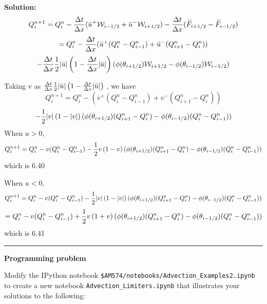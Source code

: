 \documentclass[11pt]{article}
\begin{document}
\vskip 1cm
{\bf Solution:}
\[
Q_i^{n+1} = Q_i^n - \frac{\Delta t}{\Delta x} (\bar u^+ {\cal W}_{i-1/2}  + \bar u^- {\cal W}_{i+1/2})
-\frac{\Delta t}{\Delta x} (\widetilde F_{i+1/2} - \widetilde F_{i-1/2})
\]
\[= Q_i^n - \frac{\Delta t}{\Delta x} (\bar u^+ (Q_i^n - Q_{i-1}^n)  + \bar u^-(Q_{i+1}^n - Q_{i}^n))
\]
\[-\frac{\Delta t}{\Delta x}{\frac{1}{2}} |\bar u| 
\left(1 - \frac{\Delta t}{\Delta x} |\bar u|\right) ( \phi(\theta_{i+1/2}) {\cal W}_{i+1/2} - \phi(\theta_{i-1/2}) {\cal W}_{i-1/2})
\]
 
Taking v as $\frac{\Delta t}{\Delta x} {\frac{1}{2}} |\bar u| 
\left(1 - \frac{\Delta t}{\Delta x} |\bar u|\right)$ , we have
\[
Q_i^{n+1}= Q_i^n -(v^+ (Q_i^n - Q_{i-1}^n)  +  v^-(Q_{i+1}^n - Q_{i}^n))
\]
\[-{\frac{1}{2}} |v| 
\left(1 -|v|\right) ( \phi(\theta_{i+1/2}) (Q_{i+1}^n - Q_{i}^n) - \phi(\theta_{i-1/2}) (Q_i^n - Q_{i-1}^n))
\]
When $u>0$, 
\[
Q_i^{n+1}= Q_i^n - v (Q_i^n - Q_{i-1}^n)  
-{\frac{1}{2}} v 
\left(1 -v\right) ( \phi(\theta_{i+1/2}) (Q_{i+1}^n - Q_{i}^n) - \phi(\theta_{i-1/2}) (Q_i^n - Q_{i-1}^n))
\]
which is 6.40

When $u<0$, 
\[
Q_i^{n+1}= Q_i^n - v (Q_i^n - Q_{i-1}^n)  
-{\frac{1}{2}} |v| 
\left(1 -|v|\right) ( \phi(\theta_{i+1/2}) (Q_{i+1}^n - Q_{i}^n) - \phi(\theta_{i-1/2}) (Q_i^n - Q_{i-1}^n))
\]
\[= Q_i^n - v (Q_i^n - Q_{i-1}^n)  
+{\frac{1}{2}} v 
\left(1 +v\right) ( \phi(\theta_{i+1/2}) (Q_{i+1}^n - Q_{i}^n) - \phi(\theta_{i-1/2}) (Q_i^n - Q_{i-1}^n))
\]
which is 6.41

\newpage

\vskip 1cm
\hrule
{\bf Programming problem}

Modify the IPython notebook \verb+$AM574/notebooks/Advection_Examples2.ipynb+
to create a new notebook \verb+Advection_Limiters.ipynb+ that illustrates
your solutions to the following:
\end{document}
